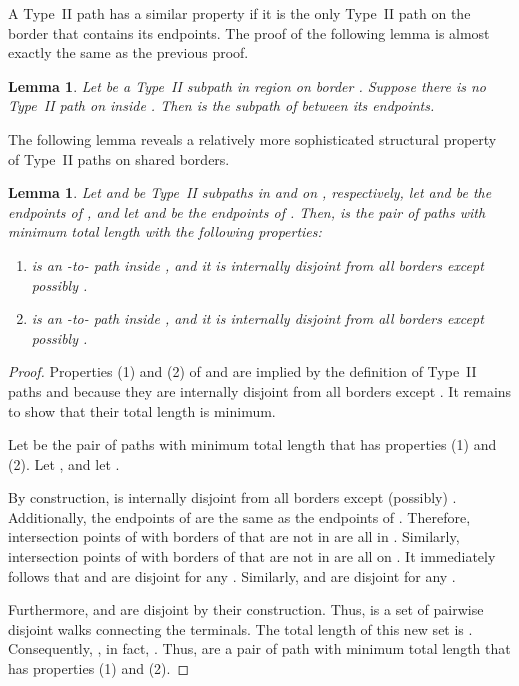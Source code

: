 \documentclass[11pt,twoside]{article}
\newtheorem{lemma}[theorem]{Lemma}
\begin{document}
A Type~II path has a similar property if it is the only Type~II path on the border that contains its endpoints. The proof of the following lemma is almost exactly the same as the previous proof.
\begin{lemma} 
\label{lem:beta_opt0}
Let  be a Type~II subpath in region  on border .  Suppose there is no Type~II path on  inside .
Then  is the subpath of  between its endpoints.  \end{lemma}

The following lemma reveals a relatively more sophisticated structural property of Type~II paths on shared borders.

\begin{lemma}
\label{lem:beta_opt}
Let  and  be  Type~II subpaths in  and  on , respectively, let  and  be the endpoints of , and let  and  be the endpoints of .
Then,  is the pair of paths with \emph{minimum total length} with the following properties:
\begin{enumerate}[(1)]
\item  is an -to- path inside , and it is internally disjoint from all borders except possibly .
\item  is an -to- path inside , and it is internally disjoint from all borders except possibly .  \end{enumerate}
\end{lemma}
\begin{proof}
Properties (1) and (2) of  and  are implied by the definition of Type~II paths and because they are internally disjoint from all borders except .  It remains to show that their total length is minimum.

Let  be the pair of paths with minimum total length that has properties (1) and (2). 
Let , and let .

By construction,  is internally disjoint from all borders except (possibly) .  Additionally, the endpoints of  are the same as the endpoints of .
Therefore, intersection points of  with borders of  that are not in  are all in .
Similarly, intersection points of  with borders of  that are not in  are all on .
It immediately follows that  and  are disjoint for any .
Similarly,  and  are disjoint for any .

Furthermore,  and  are disjoint by their construction.  Thus,  is a set of  pairwise disjoint walks connecting the terminals.  The total length of this new set is .  Consequently, , in fact, .  Thus,  are a pair of path with minimum total length that has properties (1) and (2).
\end{proof}
\end{document}

